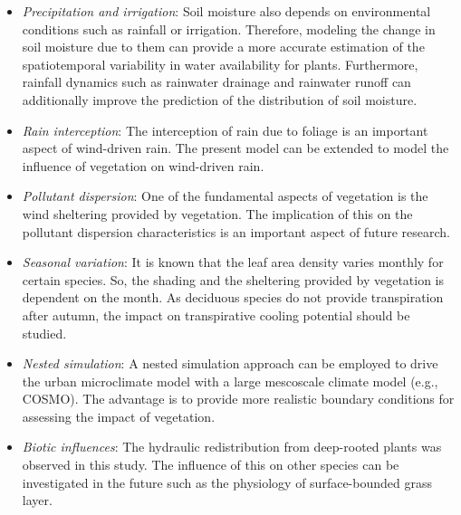 \begin{itemize}
	\item \textit{Precipitation and irrigation}: Soil moisture also depends on environmental conditions such as rainfall or irrigation. Therefore, modeling the change in soil moisture due to them can provide a more accurate estimation of the spatiotemporal variability in water availability for plants. Furthermore, rainfall dynamics such as rainwater drainage and rainwater runoff can additionally improve the prediction of the distribution of soil moisture.
	
	\item \textit{Rain interception}: The interception of rain due to foliage is an important aspect of wind-driven rain. The present model can be extended to model the influence of vegetation on wind-driven rain.

	\item \textit{Pollutant dispersion}: One of the fundamental aspects of vegetation is the wind sheltering provided by vegetation. The implication of this on the pollutant dispersion characteristics is an important aspect of future research. 
	
	\item \textit{Seasonal variation}: It is known that the leaf area density varies monthly for certain species. So, the shading and the sheltering provided by vegetation is dependent on the month. As deciduous species do not provide transpiration after autumn, the impact on transpirative cooling potential should be studied.
	
	\item \textit{Nested simulation}: A nested simulation approach can be employed to drive the urban microclimate model with a large mescoscale climate model (e.g., COSMO). The advantage is to provide more realistic boundary conditions for assessing the impact of vegetation.

	
	\item \textit{Biotic influences}: The hydraulic redistribution from deep-rooted plants was observed in this study. The influence of this on other species can be investigated in the future such as the physiology of surface-bounded grass layer.


\end{itemize}
